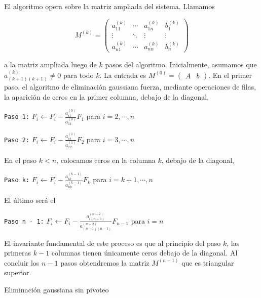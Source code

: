 El algoritmo opera sobre la matriz ampliada del sistema. Llamamos

\[M^{(k)} = \left(\begin{array}{ccc|c}
a_{11}^{(k)} & \cdots & a_{1n}^{(k)} & b_1^{(k)}\\
\vdots & \ddots & \vdots & \vdots\\
a_{n1}^{(k)} & \cdots & a_{nn}^{(k)} & b_n^{(k)}
\end{array}\right)\]

a la matriz ampliada luego de $k$ pasos del algoritmo. Inicialmente, asumamos que $a_{(k+1)(k+1)}^{(k)} \neq 0$ para todo $k$. La entrada es $M^{(0)} = \left(\begin{array}{c|c}A & b\end{array}\right)$. En el primer paso, el algoritmo de eliminación gaussiana fuerza, mediante operaciones de filas, la aparición de ceros en la primer columna, debajo de la diagonal,

\texttt{Paso 1:} $F_i \leftarrow F_i - \frac{a_{i1}^{(0)}}{a_{11}^{(0)}}F_1$ para $i = 2, \cdots, n$

\texttt{Paso 2:} $F_i \leftarrow F_i - \frac{a_{i2}^{(1)}}{a_{22}^{(1)}}F_2$ para $i = 3, \cdots, n$

En el paso $k < n$, colocamos ceros en la columna $k$, debajo de la diagonal,

\texttt{Paso k:} $F_i \leftarrow F_i - \frac{a_{ik}^{(k - 1)}}{a_{kk}^{(k - 1)}}F_k$ para $i = k + 1, \cdots, n$

El último será el

\texttt{Paso n - 1:} $F_i \leftarrow F_i - \frac{a_{i(n-1)}^{(n-2)}}{a_{(n-1)(n-1)}^{(n-2)}}F_{n - 1}$ para $i = n$

El invariante fundamental de este proceso es que al principio del paso $k$, las primeras $k - 1$ columnas tienen únicamente ceros debajo de la diagonal. Al concluir los $n - 1$ pasos obtendremos la matriz $M^{(n - 1)}$ que es triangular superior.
 
\begin{algorithm}
\dontprintsemicolon

\caption[]{Eliminación gaussiana sin pivoteo}
\end{algorithm}

